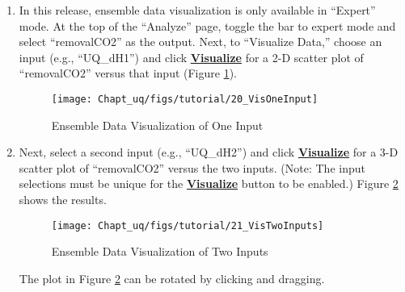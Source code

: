 \begin{enumerate}
\item{In this release, ensemble data visualization is only available in ``Expert'' mode. At the top of the ``Analyze'' page, toggle the bar to expert mode and select ``removalCO2'' as the output. Next, to ``Visualize Data,'' choose an input (e.g., ``UQ\_dH1'') and click \textbf{\underline{Visualize}} for a 2-D scatter plot of ``removalCO2'' versus that input (Figure \ref{fig:uqt_splot1_results}).
\begin{figure}[H]
\centering \texttt{[image: Chapt\_uq/figs/tutorial/20\_VisOneInput]}
\caption{Ensemble Data Visualization of One Input}
\label{fig:uqt_splot1_results}
\end{figure}
}
\item{Next, select a second input (e.g., ``UQ\_dH2'') and click \textbf{\underline{Visualize}} for a 3-D scatter plot of ``removalCO2'' versus the two inputs. (Note: The input selections must be unique for the \textbf{\underline{Visualize}} button to be enabled.)  Figure \ref{fig:uqt_splot2_results} shows the results.
\begin{figure}[H]
\centering \texttt{[image: Chapt\_uq/figs/tutorial/21\_VisTwoInputs]}
\caption{Ensemble Data Visualization of Two Inputs}
\label{fig:uqt_splot2_results}
\end{figure}
The plot in Figure \ref{fig:uqt_splot2_results} can be rotated by clicking and dragging.
}
\end{enumerate}

